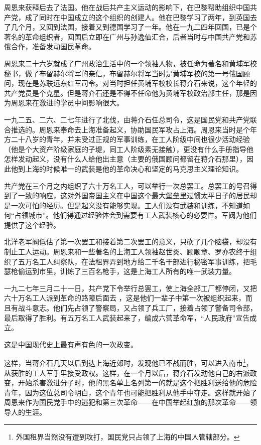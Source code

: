 \documentclass[10pt]{book}
\begin{document}
周恩来获释后去了法国。他在战后共产主义运动的影响下，在巴黎帮助组织中国共产党，成了同时在中国成立的这个组织的创建人。他在巴黎学习了两年，到英国去了几个月，又回到法国，接着又到德国学习了一年。他在一九二四年回国，已是个著名的革命组织者，回国后立即在广州与孙逸仙汇合，后者当时与中国共产党和苏俄合作，准备发动国民革命。

周恩来二十六岁就成了广州政治生活中的一个领袖人物，被任命为著名和黄埔军校秘书，做了布留赫尔将军的亲信，布留赫尔将军当时是黄埔军校的第一号俄国顾问，现在是苏联远东红军司令。对当时担任黄埔军校校长蒋介石来说，这个年轻的共产党员是个克星。但是蒋介石还是不得不任命他为黄埔军校政治部主任，那是因为周恩来在激进的学员中间影响很大。

一九二五、二六、二七年进行了北伐，由蒋介石任总司令，这是国民党和共产党联合推选的。周恩来奉命去上海准备起义，协助国民军攻占上海。周恩来当时是个年方二十八岁的青年，并未受过正规的军事训练，在工人阶级中间也很少活动经验（他是个大资产阶级家庭的子堤，同工人阶级素无接触），更没有什么手册指导他怎样发动起义，没有什么人给他出主意（主要的俄国顾问都留在蒋介石那里），因此他到上海的时候唯一的武装是他的革命决心和坚定的马克思主义理论知识。

共产党在三个月之内组织了六十万名工人，可以举行一次总罢工。总罢工的号召得到了一致的响应，这对外国帝国主义在中国这个最大堡垒里过惯太平日子的居民却是一次可怕的经历。但是起义没有能够实现。工人们没有武装和训练，不知道如何“占领城市”。他们得通过经验体会到需要有工人武装核心的必要性。军阀为他们提供了这个经验。

北洋老军阀低估了第一次罢工和接着第二次罢工的意义，只砍了几个脑袋，却没有制止工人运动。周恩来和一些著名的上海工人领袖赵世炎、顾顺章、罗亦农终于组织了五万名工人纠察队，在法租界弄到地方给二千名干部进行秘密军事训练，把毛瑟枪偷运到市里，训练了三百名枪手，这是上海工人所有的唯一武装力量。

一九二七年三月二十一日，共产党下令举行总罢工，使上海全部工厂都停闭，又把六十万名工人派到革命的路障后面去 ，这是他们一辈子中第一次被组织起来，而且有战斗意志。他们先占领了警察局，又占领了兵工厂，接着占领了警备司令部，最后取得了胜利。有五万名工人武装起来了，编成六营革命军，“人民政府”宣告成立。

这是中国现代史上最有声有色的一次政变。

这样，当蒋介石几天以后到达上海近郊时，发现他已不战而胜，可以进入南市\footnote{外国租界当然没有遭到攻打，国民党只占领了上海的中国人管辖部分。}，从获胜的工人军手里接受政权。这样，在一个月以后，蒋介石发动他自己的右派政变，开始杀害激进分子时，他的黑名单上名列第一的就是这个把胜利送给他的危险青年，因为这位总司令明白，这个青年也可能把胜利从他手中夺走。这样就开始了周恩来作为国民党手中的逃犯和第三次革命——在中国举起红旗的那次革命——领导人的生涯。
\end{document}
